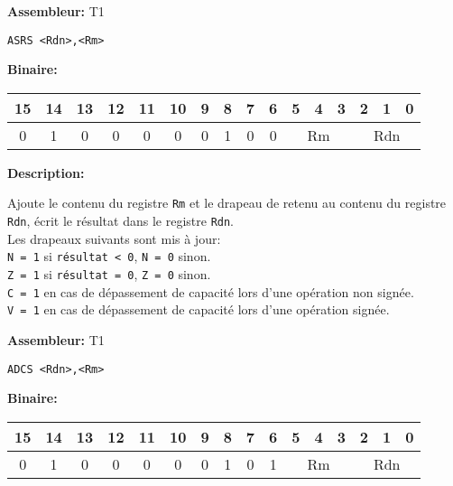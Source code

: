 \documentclass{article}
\begin{document}
    \textbf{Assembleur:} T1

    \begin{lstlisting}
ASRS <Rdn>,<Rm>
    \end{lstlisting}

    \textbf{Binaire:}

    \begin{tabular}{| c c c c c c c c c c c c c c c c |}
        \hline
        15 & 14 & 13 & 12 & 11 & 10 & \multicolumn{1}{|c}{9} & 8 & 7 & 6 & \multicolumn{1}{|c}{5} & 4 & 3 & \multicolumn{1}{|c}{2} & 1 & 0 \\
        \hline
        0 & 1 & 0 & 0 & 0 & 0 & \multicolumn{1}{|c}{0} & 1 & 0 & 0 & \multicolumn{3}{|c}{Rm} & \multicolumn{3}{|c|}{Rdn} \\
        \hline
    \end{tabular}



    \textbf{Description: }

    Ajoute le contenu du registre \texttt{Rm} et le drapeau de retenu au contenu du registre \texttt{Rdn}, écrit le résultat dans le registre \texttt{Rdn}.\\
    Les drapeaux suivants sont mis à jour:\\
    \texttt{N = 1} si \texttt{résultat < 0}, \texttt{N = 0} sinon.\\
    \texttt{Z = 1} si \texttt{résultat = 0}, \texttt{Z = 0} sinon.\\
    \texttt{C = 1} en cas de dépassement de capacité lors d'une opération non signée.\\
    \texttt{V = 1} en cas de dépassement de capacité lors d'une opération signée.

    \textbf{Assembleur:} T1

    \begin{lstlisting}
ADCS <Rdn>,<Rm>
    \end{lstlisting}

    \textbf{Binaire:}

    \begin{tabular}{| c c c c c c c c c c c c c c c c |}
        \hline
        15 & 14 & 13 & 12 & 11 & 10 & \multicolumn{1}{|c}{9} & 8 & 7 & 6 & \multicolumn{1}{|c}{5} & 4 & 3 & \multicolumn{1}{|c}{2} & 1 & 0 \\
        \hline
        0 & 1 & 0 & 0 & 0 & 0 & \multicolumn{1}{|c}{0} & 1 & 0 & 1 & \multicolumn{3}{|c}{Rm} & \multicolumn{3}{|c|}{Rdn} \\
        \hline
    \end{tabular}
\end{document}

